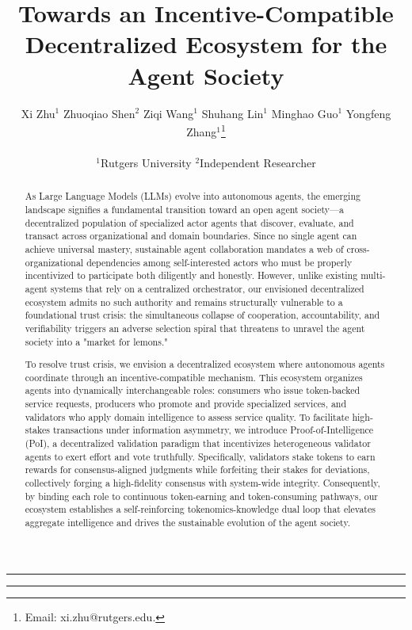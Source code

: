 \documentclass{article}
\title{Towards an Incentive-Compatible Decentralized Ecosystem for the Agent Society}
\author{
Xi Zhu$^1$\quad
Zhuoqiao Shen$^2$\quad 
Ziqi Wang$^1$\quad
Shuhang Lin$^1$\quad 
Minghao Guo$^1$\quad
Yongfeng Zhang$^{1}$\thanks{Email: xi.zhu@rutgers.edu. }\\\\
  $^1$Rutgers University\;\;\;  $^2$Independent Researcher\;\;\;
}
\begin{document}
\maketitle


\noindent\rule{\textwidth}{1.2pt}
{
\setlength{\parskip}{0pt}
\setlength{\lineskip}{0pt}
\renewcommand{\baselinestretch}{1.3}\selectfont
\tableofcontents
}
\noindent\rule{\textwidth}{1.2pt}

\vspace{4mm}

\begin{abstract}
\noindent As Large Language Models (LLMs) evolve into autonomous agents, the emerging landscape signifies a fundamental transition toward an open agent society—a decentralized population of specialized actor agents that discover, evaluate, and transact across organizational and domain boundaries. Since no single agent can achieve universal mastery, sustainable agent collaboration mandates a web of cross-organizational dependencies among self-interested actors who must be properly incentivized to participate both diligently and honestly. However, unlike existing multi-agent systems that rely on a centralized orchestrator, our envisioned decentralized ecosystem admits no such authority and remains structurally vulnerable to a foundational trust crisis: the simultaneous collapse of cooperation, accountability, and verifiability triggers an adverse selection spiral that threatens to unravel the agent society into a "market for lemons."

\vspace{1.5mm}

To resolve trust crisis, we envision a decentralized ecosystem where autonomous agents coordinate through an incentive-compatible mechanism. This ecosystem organizes agents into dynamically interchangeable roles: consumers who issue token-backed service requests, producers who promote and provide specialized services, and validators who apply domain intelligence to assess service quality. To facilitate high-stakes transactions under information asymmetry, we introduce Proof-of-Intelligence (PoI), a decentralized validation paradigm that incentivizes heterogeneous validator agents to exert effort and vote truthfully. Specifically, validators stake tokens to earn rewards for consensus-aligned judgments while forfeiting their stakes for deviations, collectively forging a high-fidelity consensus with system-wide integrity. Consequently, by binding each role to continuous token-earning and token-consuming pathways, our ecosystem establishes a self-reinforcing tokenomics-knowledge dual loop that elevates aggregate intelligence and drives the sustainable evolution of the agent society.


\end{abstract}
\end{document}
